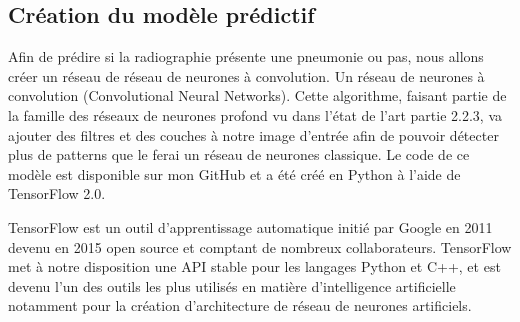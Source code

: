 \subsection{Création du modèle prédictif}
Afin de prédire si la radiographie présente une pneumonie ou pas, nous allons créer un réseau de réseau de neurones à convolution. Un réseau de neurones à convolution (Convolutional Neural Networks). Cette algorithme, faisant partie de la famille des réseaux de neurones profond vu dans l'état de l'art partie 2.2.3, va ajouter des filtres et des couches à notre image d'entrée afin de pouvoir détecter plus de patterns que le ferai un réseau de neurones classique. Le code de ce modèle est disponible sur mon GitHub \cite{pneumoniaDepot} et a été créé en Python à l'aide de TensorFlow 2.0.\par
TensorFlow\cite{tensorflowDepot} est un outil d'apprentissage automatique initié par Google en 2011 devenu en 2015 open source et comptant de nombreux collaborateurs. TensorFlow met à notre disposition une API stable pour les langages Python et C++, et est devenu l'un des outils les plus utilisés en matière d'intelligence artificielle notamment pour la création d'architecture de réseau de neurones artificiels.

